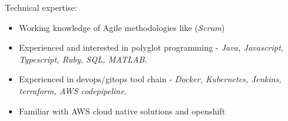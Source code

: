 
\inlineheadsection  %
  {Technical expertise:}
 {
 \emph{}
  \begin{itemize}
      \item Working knowledge of Agile methodologies like (\emph{Scrum})
      \item Experienced and interested in polyglot programming - \emph{Java, Javascript, Typescript, Ruby, SQL, MATLAB}.
      \item Experienced in devops/gitops tool chain - \emph{Docker, Kubernetes, Jenkins, terraform, AWS codepipeline}.
      \item Familiar with AWS cloud native solutions and openshift
  \end{itemize}
  }
